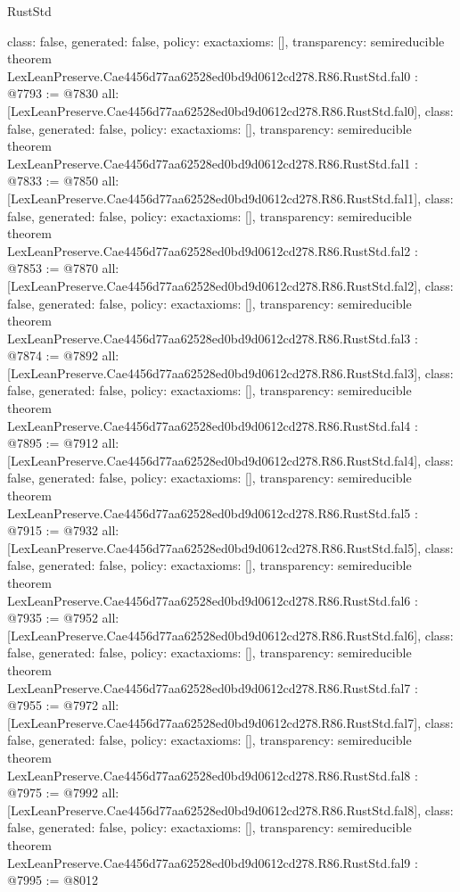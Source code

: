 \begin{lexlean}{RustStd}
\begin{coremodule}
{  class: false,
  generated: false,
  policy: exact{axioms: []},
  transparency: semireducible
}
theorem LexLeanPreserve.Cae4456d77aa62528ed0bd9d0612cd278.R86.RustStd.fal0 : @7793 := @7830 {
  all: [LexLeanPreserve.Cae4456d77aa62528ed0bd9d0612cd278.R86.RustStd.fal0],
  class: false,
  generated: false,
  policy: exact{axioms: []},
  transparency: semireducible
}
theorem LexLeanPreserve.Cae4456d77aa62528ed0bd9d0612cd278.R86.RustStd.fal1 : @7833 := @7850 {
  all: [LexLeanPreserve.Cae4456d77aa62528ed0bd9d0612cd278.R86.RustStd.fal1],
  class: false,
  generated: false,
  policy: exact{axioms: []},
  transparency: semireducible
}
theorem LexLeanPreserve.Cae4456d77aa62528ed0bd9d0612cd278.R86.RustStd.fal2 : @7853 := @7870 {
  all: [LexLeanPreserve.Cae4456d77aa62528ed0bd9d0612cd278.R86.RustStd.fal2],
  class: false,
  generated: false,
  policy: exact{axioms: []},
  transparency: semireducible
}
theorem LexLeanPreserve.Cae4456d77aa62528ed0bd9d0612cd278.R86.RustStd.fal3 : @7874 := @7892 {
  all: [LexLeanPreserve.Cae4456d77aa62528ed0bd9d0612cd278.R86.RustStd.fal3],
  class: false,
  generated: false,
  policy: exact{axioms: []},
  transparency: semireducible
}
theorem LexLeanPreserve.Cae4456d77aa62528ed0bd9d0612cd278.R86.RustStd.fal4 : @7895 := @7912 {
  all: [LexLeanPreserve.Cae4456d77aa62528ed0bd9d0612cd278.R86.RustStd.fal4],
  class: false,
  generated: false,
  policy: exact{axioms: []},
  transparency: semireducible
}
theorem LexLeanPreserve.Cae4456d77aa62528ed0bd9d0612cd278.R86.RustStd.fal5 : @7915 := @7932 {
  all: [LexLeanPreserve.Cae4456d77aa62528ed0bd9d0612cd278.R86.RustStd.fal5],
  class: false,
  generated: false,
  policy: exact{axioms: []},
  transparency: semireducible
}
theorem LexLeanPreserve.Cae4456d77aa62528ed0bd9d0612cd278.R86.RustStd.fal6 : @7935 := @7952 {
  all: [LexLeanPreserve.Cae4456d77aa62528ed0bd9d0612cd278.R86.RustStd.fal6],
  class: false,
  generated: false,
  policy: exact{axioms: []},
  transparency: semireducible
}
theorem LexLeanPreserve.Cae4456d77aa62528ed0bd9d0612cd278.R86.RustStd.fal7 : @7955 := @7972 {
  all: [LexLeanPreserve.Cae4456d77aa62528ed0bd9d0612cd278.R86.RustStd.fal7],
  class: false,
  generated: false,
  policy: exact{axioms: []},
  transparency: semireducible
}
theorem LexLeanPreserve.Cae4456d77aa62528ed0bd9d0612cd278.R86.RustStd.fal8 : @7975 := @7992 {
  all: [LexLeanPreserve.Cae4456d77aa62528ed0bd9d0612cd278.R86.RustStd.fal8],
  class: false,
  generated: false,
  policy: exact{axioms: []},
  transparency: semireducible
}
theorem LexLeanPreserve.Cae4456d77aa62528ed0bd9d0612cd278.R86.RustStd.fal9 : @7995 := @8012 {
}
\end{coremodule}
\end{lexlean}
